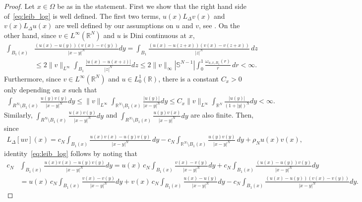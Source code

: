 \documentclass[11pt]{article}
\newcommand{\R}{\mathbb{R}}
\numberwithin{equation}{section}
\begin{document}
\begin{proof}
Let $x\in \Omega$ be as in the statement.  First we show that the right hand side of~\eqref{eq:leib_log} is well defined. The first two terms, $u(x)L_{\Delta}v(x)$ and $v(x) L_{\Delta}u(x)$ are well defined by our assumptions on $u$ and $v$, see \cite[Proposition 2.2]{CW19}. On the other hand, since $v\in L^\infty(\R^N)$ and $u$ is Dini continuous at $x$,
%
\begin{align*}
    \int_{B_1(x)}&\frac{(u(x)-u(y))(v(x)-v(y))}{|x-y|^N}dy = \int_{B_1}\frac{(u(x)-u(z+x))(v(x)-v(z+x))}{|z|^N}\,dz \\
    &\leq 2\|v\|_{L^\infty}\int_{B_1}\frac{|u(x)-u(x+z)|}{|z|^N}dz
    \leq 2 \|v\|_\infty|\mathbb S^{N-1}|\int_0^1\frac{\omega_{u,x,B_1}(r)}{r}\,dr<\infty.
\end{align*}
%
Furthermore, since $v\in L^\infty(\mathbb R^N)$ and $u\in L_0^1(\mathbb R)$, there is a constant $C_x>0$ only depending on $x$ such that
\begin{align*}
    \int_{R^{N}\setminus B_1(x)}\frac{u(y)v(y)}{|x-y|^N}dy \leq \|v\|_{L^\infty} \int_{\R^N\setminus B_1(x)}\frac{|u(y)|}{|x-y|^N}dy \leq C_{x}\|v\|_{L^\infty}\int_{\R^N}\frac{|u(y)|}{(1+|y|)^N}dy<\infty.
\end{align*}
Similarly, $\int_{R^{N}\setminus B_1(x)}\frac{u(x)v(y)}{|x-y|^N}dy$ and $\int_{R^{N}\setminus B_1(x)}\frac{u(y)v(x)}{|x-y|^N}dy$ are also finite. Then, since
\begin{align*}
L_{\Delta}[uv](x)=c_{N}\int_{B_{1}(x)}\frac{u(x)v(x)-u(y)v(y)}{|x-y|^{N}}\, dy-c_{N}\int_{\mathbb{R}^{N}\setminus B_{1}(x)}\frac{u(y)v(y)}{|x-y|^{N}}\, dy+\rho_{N}u(x)v(x),
\end{align*}
identity~\eqref{eq:leib_log} follows by noting that
%
\begin{align*}
    c_{N}&\int_{B_1(x)}\frac{u(x)v(x)-u(y)v(y)}{|x-y|^N}dy=u(x)\, c_{N}\int_{B_1(x)}\frac{v(x)-v(y)}{|x-y|^N}dy+c_{N}\int_{B_1(x)}\frac{(u(x)-u(y))v(y)}{|x-y|^N}dy \\
    &=u(x)\, c_{N}\int_{B_1(x)}\frac{v(x)-v(y)}{|x-y|^N}dy+v(x)\, c_{N}\int_{B_1(x)}\frac{u(x)-u(y)}{|x-y|^N}dy- c_{N}\int_{B_1(x)}\frac{(u(x)-u(y))(v(x)-v(y))}{|x-y|^N}dy.
\end{align*}

\end{proof}
\end{document}
